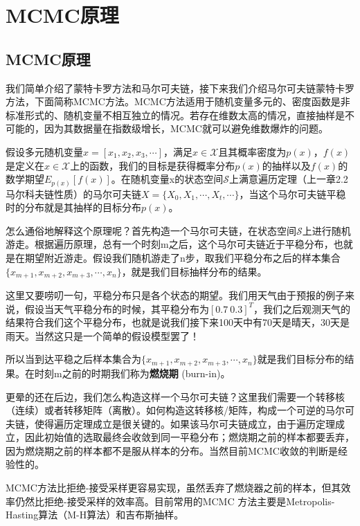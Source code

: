 \section{MCMC原理}

\subsection{MCMC原理}

我们简单介绍了蒙特卡罗方法和马尔可夫链，接下来我们介绍马尔可夫链蒙特卡罗方法，下面简称MCMC方法。MCMC方法适用于随机变量多元的、密度函数是非标准形式的、随机变量不相互独立的情况。若存在维数太高的情况，直接抽样是不可能的，因为其数据量在指数级增长，MCMC就可以避免维数爆炸的问题。

假设多元随机变量\(x = [x_{1},x_{2},x_{3},\cdots]\)，满足\(x\in \mathcal{X}\)且其概率密度为\(p(x)\)，\(f(x)\)是定义在\(x\in \mathcal{X}\)上的函数，我们的目标是获得概率分布\(p(x)\)的抽样以及\(f(x)\)的数学期望\(E_{p(x)}[f(x)]\)。在随机变量x的状态空间\(\mathcal{S}\)上满意遍历定理（上一章2.2马尔科夫链性质）的马尔可夫链\(X = \{X_0,X_1,\cdots,X_t,\cdots\}\)，当这个马尔可夫链平稳时的分布就是其抽样的目标分布\(p(x)\)。

怎么通俗地解释这个原理呢？首先构造一个马尔可夫链，在状态空间\(\mathcal{S}\)上进行随机游走。根据遍历原理，总有一个时刻m之后，这个马尔可夫链近于平稳分布，也就是在期望附近游走。假设我们随机游走了n步，取我们平稳分布之后的样本集合\(\{x_{m+1},x_{m+2},x_{m+3},\cdots,x_{n}\}\)，就是我们目标抽样分布的结果。

这里又要唠叨一句，平稳分布只是各个状态的期望。我们用天气由于预报的例子来说，假设当天气平稳分布的时候，其平稳分布为\([0.7 \ 0.3]^T\)，我们之后观测天气的结果符合我们这个平稳分布，也就是说我们接下来100天中有70天是晴天，30天是雨天。当然这只是一个简单的假设模型罢了！

所以当到达平稳之后样本集合为\(\{x_{m+1},x_{m+2},x_{m+3},\cdots,x_{n}\}\)就是我们目标分布的结果。在时刻m之前的时期我们称为\textbf{燃烧期} (burn-in)。

更晕的还在后边，我们怎么构造这样一个马尔可夫链？这里我们需要一个转移核（连续）或者转移矩阵（离散）。如何构造这转移核/矩阵，构成一个可逆的马尔可夫链，使得遍历定理成立是很关键的。如果该马尔可夫链成立，由于遍历定理成立，因此初始值的选取最终会收敛到同一平稳分布；燃烧期之前的样本都要丢弃，因为燃烧期之前的样本都不是服从样本的分布。当然目前MCMC收敛的判断是经验性的。

MCMC方法比拒绝-接受采样更容易实现，虽然丢弃了燃烧器之前的样本，但其效率仍然比拒绝-接受采样的效率高。目前常用的MCMC
方法主要是Metropolis-Hasting算法（M-H算法）和吉布斯抽样。

